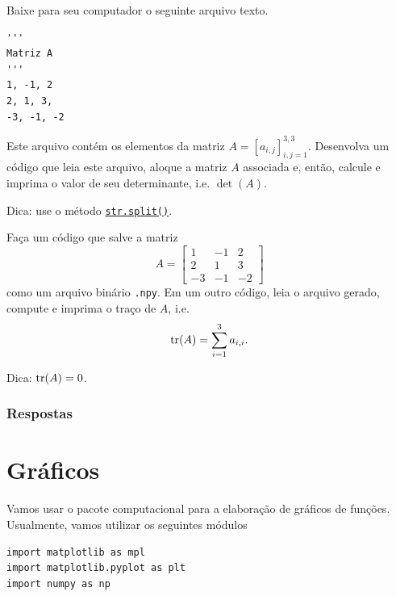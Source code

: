\begin{exer}
  Baixe para seu computador o seguinte arquivo texto.

\begin{lstlisting}[caption=mat.txt]
'''
Matriz A
'''
1, -1, 2
2, 1, 3,
-3, -1, -2
\end{lstlisting}

Este arquivo contém os elementos da matriz $A = [a_{i,j}]_{i,j=1}^{3,3}$. Desenvolva um código que leia este arquivo, aloque a matriz $A$ associada e, então, calcule e imprima o valor de seu determinante, i.e. $\det(A)$.
\end{exer}
\begin{resp}
  Dica: use o método \href{https://docs.python.org/3/library/stdtypes.html#str.split}{\lstinline+str.split()+}.
\end{resp}

\begin{exer}
  Faça um código que salve a matriz
  \begin{equation}
    A =
    \begin{bmatrix}
      1 & -1 & 2\\
      2 & 1 & 3\\
      -3 & -1 & -2
    \end{bmatrix}
  \end{equation}
  como um arquivo binário \lstinline+.npy+. Em um outro código, leia o arquivo gerado, compute e imprima o traço de $A$, i.e.
  \begin{equation}
    \operatorname{tr}(A) = \sum_{i=1}^3 a_{i,i}.
  \end{equation}
\end{exer}
\begin{resp}
  Dica: $\operatorname{tr}(A) = 0$.
\end{resp}

\ifisbook
\subsubsection{Respostas}
\shipoutAnswer
\fi

\section{Gráficos}\label{cap_ag_sec_graf}

Vamos usar o pacote computacional {\matplotlib} para a elaboração de gráficos de funções. Usualmente, vamos utilizar os seguintes módulos {\python}

\begin{lstlisting}
import matplotlib as mpl
import matplotlib.pyplot as plt
import numpy as np
\end{lstlisting}

